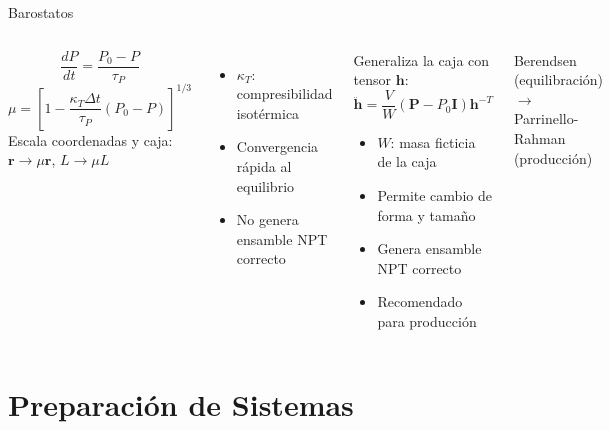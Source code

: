 \documentclass[aspectratio=169, 10pt]{beamer}
\begin{document}
\begin{frame}{Barostatos}
\begin{columns}[T]
\begin{tcolorbox}[formulabox, title={Barostato de Berendsen}, equal height group=ehg-bar-a]
\small
\[
\frac{dP}{dt} = \frac{P_0 - P}{\tau_P}
\]
\[
\mu = \left[1 - \frac{\kappa_T \Delta t}{\tau_P}(P_0 - P)\right]^{1/3}
\]
Escala coordenadas y caja: $\mathbf{r} \rightarrow \mu\mathbf{r}$, $L \rightarrow \mu L$
\end{tcolorbox}
\vspace{0.3em}
\begin{itemize}
  \item $\kappa_T$: compresibilidad isotérmica
  \item Convergencia rápida al equilibrio
  \item No genera ensamble NPT correcto
\end{itemize}

\begin{tcolorbox}[warningbox, title={Barostato de Parrinello-Rahman}, equal height group=ehg-bar-a]
\small
Generaliza la caja con tensor $\mathbf{h}$:
\[
\ddot{\mathbf{h}} = \frac{V}{W}\left(\mathbf{P} - P_0\mathbf{I}\right)\mathbf{h}^{-T}
\]
\begin{itemize}
  \item $W$: masa ficticia de la caja
  \item Permite cambio de forma y tamaño
  \item Genera ensamble NPT correcto
  \item Recomendado para producción
\end{itemize}
\end{tcolorbox}
\vspace{0.2em}
\begin{tcolorbox}[definitionbox, title={Secuencia típica}]
\scriptsize
Berendsen (equilibración) $\rightarrow$ Parrinello-Rahman (producción)
\end{tcolorbox}
\end{columns}
\end{frame}

\section{Preparación de Sistemas}
\end{document}
